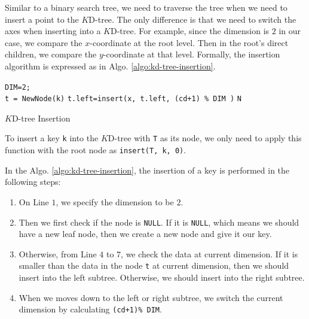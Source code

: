 Similar to a binary search tree, we need to traverse the tree when we need to insert a point to the $K$D-tree. The only difference is that we need to switch the axes when inserting into a $K$D-tree. For example, since the dimension is $2$ in our case, we compare the $x$-coordinate at the root level. Then in the root's direct children, we compare the $y$-coordinate at that level. Formally, the insertion algorithm is expressed as in Algo. \ref{algo:kd-tree-insertion}.

\begin{algorithm}[H]
\SetAlgoLined
{}
	\texttt{DIM=2;}\\
	 {
		\texttt{t = NewNode(k)}
	}
	 {
		\texttt{t.left=insert(x, t.left, (cd+1) \% DIM )}
	}
 	\Return \texttt{N}
 \caption{$K$D-tree Insertion}
 \label{algo:kd-tree-insertion}
\end{algorithm}

To insert a key \texttt{k} into the $K$D-tree with \texttt{T} as its node, we only need to apply this function with the root node as \texttt{insert(T, k, 0)}. 

In the Algo. \ref{algo:kd-tree-insertion}, the insertion of a key is performed in the following steps:

\begin{enumerate}
	\item On Line $1$, we specify the dimension to be $2$.
	\item Then we first check if the node is \texttt{NULL}. If it is \texttt{NULL}, which means we should have a new leaf node, then we create a new node and give it our key.
	\item Otherwise, from Line $4$ to $7$, we check the data at current dimension. If it is smaller than the data in the node \texttt{t} at current dimension, then we should insert into the left subtree. Otherwise, we should insert into the right subtree.
	\item When we moves down to the left or right subtree, we switch the current dimension by calculating \texttt{(cd+1)\% DIM}.
\end{enumerate}

